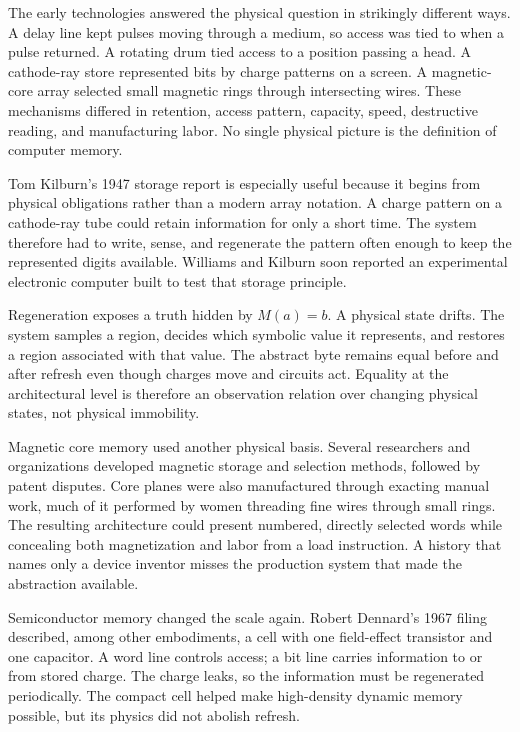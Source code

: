 The early technologies answered the physical question in strikingly different
ways. A delay line kept pulses moving through a medium, so access was tied to
when a pulse returned. A rotating drum tied access to a position passing a
head. A cathode-ray store represented bits by charge patterns on a screen. A
magnetic-core array selected small magnetic rings through intersecting wires.
These mechanisms differed in retention, access pattern, capacity, speed,
destructive reading, and manufacturing labor. No single physical picture is
the definition of computer memory.

Tom Kilburn's 1947 storage report is especially useful because it begins from
physical obligations rather than a modern array notation. A charge pattern on
a cathode-ray tube could retain information for only a short time. The system
therefore had to write, sense, and regenerate the pattern often enough to keep
the represented digits available. Williams and Kilburn soon reported an
experimental electronic computer built to test that storage principle.
\autocite{kilburn1947storage,williams1948electronic}

Regeneration exposes a truth hidden by \(M(a)=b\). A physical state drifts.
The system samples a region, decides which symbolic value it represents, and
restores a region associated with that value. The abstract byte remains equal
before and after refresh even though charges move and circuits act. Equality
at the architectural level is therefore an observation relation over changing
physical states, not physical immobility.

Magnetic core memory used another physical basis. Several researchers and
organizations developed magnetic storage and selection methods, followed by
patent disputes. Core planes were also manufactured through exacting manual
work, much of it performed by women threading fine wires through small rings.
The resulting architecture could present numbered, directly selected words
while concealing both magnetization and labor from a load instruction. A
history that names only a device inventor misses the production system that
made the abstraction available.\autocite{chm2026magneticcore}

Semiconductor memory changed the scale again. Robert Dennard's 1967 filing
described, among other embodiments, a cell with one field-effect transistor
and one capacitor. A word line controls access; a bit line carries information
to or from stored charge. The charge leaks, so the information must be
regenerated periodically. The compact cell helped make high-density dynamic
memory possible, but its physics did not abolish refresh.
\autocite{dennard1968memory}

